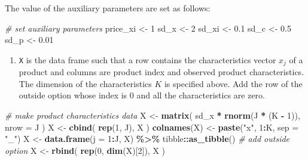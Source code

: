 \documentclass[
]{book}
\newenvironment{Shaded}{\begin{snugshade}}{\end{snugshade}}
\newcommand{\AttributeTok}[1]{\textcolor[rgb]{0.13,0.29,0.53}{#1}}
\newcommand{\CommentTok}[1]{\textcolor[rgb]{0.56,0.35,0.01}{\textit{#1}}}
\newcommand{\DecValTok}[1]{\textcolor[rgb]{0.00,0.00,0.81}{#1}}
\newcommand{\FloatTok}[1]{\textcolor[rgb]{0.00,0.00,0.81}{#1}}
\newcommand{\FunctionTok}[1]{\textcolor[rgb]{0.13,0.29,0.53}{\textbf{#1}}}
\newcommand{\NormalTok}[1]{#1}
\newcommand{\OtherTok}[1]{\textcolor[rgb]{0.56,0.35,0.01}{#1}}
\newcommand{\SpecialCharTok}[1]{\textcolor[rgb]{0.81,0.36,0.00}{\textbf{#1}}}
\newcommand{\StringTok}[1]{\textcolor[rgb]{0.31,0.60,0.02}{#1}}
\providecommand{\tightlist}{%
  \setlength{\itemsep}{0pt}\setlength{\parskip}{0pt}}
\begin{document}
The value of the auxiliary parameters are set as follows:

\begin{Shaded}
\begin{Highlighting}[]
\CommentTok{\# set auxiliary parameters}
\NormalTok{price\_xi }\OtherTok{\textless{}{-}} \DecValTok{1}
\NormalTok{sd\_x }\OtherTok{\textless{}{-}} \DecValTok{2}
\NormalTok{sd\_xi }\OtherTok{\textless{}{-}} \FloatTok{0.1}
\NormalTok{sd\_c }\OtherTok{\textless{}{-}} \FloatTok{0.5}
\NormalTok{sd\_p }\OtherTok{\textless{}{-}} \FloatTok{0.01}
\end{Highlighting}
\end{Shaded}

\begin{enumerate}
\def\labelenumi{\arabic{enumi}.}
\setcounter{enumi}{1}
\tightlist
\item
  \texttt{X} is the data frame such that a row contains the characteristics vector \(x_{j}\) of a product and columns are product index and observed product characteristics. The dimension of the characteristics \(K\) is specified above. Add the row of the outside option whose index is \(0\) and all the characteristics are zero.
\end{enumerate}

\begin{Shaded}
\begin{Highlighting}[]
\CommentTok{\# make product characteristics data}
\NormalTok{X }\OtherTok{\textless{}{-}} 
  \FunctionTok{matrix}\NormalTok{(}
\NormalTok{    sd\_x }\SpecialCharTok{*} \FunctionTok{rnorm}\NormalTok{(J }\SpecialCharTok{*}\NormalTok{ (K }\SpecialCharTok{{-}} \DecValTok{1}\NormalTok{)), }
    \AttributeTok{nrow =}\NormalTok{ J}
\NormalTok{    )}
\NormalTok{X }\OtherTok{\textless{}{-}} 
  \FunctionTok{cbind}\NormalTok{(}
    \FunctionTok{rep}\NormalTok{(}\DecValTok{1}\NormalTok{, J), }
\NormalTok{    X}
\NormalTok{    )}
\FunctionTok{colnames}\NormalTok{(X) }\OtherTok{\textless{}{-}} \FunctionTok{paste}\NormalTok{(}\StringTok{"x"}\NormalTok{, }\DecValTok{1}\SpecialCharTok{:}\NormalTok{K, }\AttributeTok{sep =} \StringTok{"\_"}\NormalTok{)}
\NormalTok{X }\OtherTok{\textless{}{-}} 
  \FunctionTok{data.frame}\NormalTok{(}\AttributeTok{j =} \DecValTok{1}\SpecialCharTok{:}\NormalTok{J, X) }\SpecialCharTok{\%\textgreater{}\%}
\NormalTok{  tibble}\SpecialCharTok{::}\FunctionTok{as\_tibble}\NormalTok{()}
\CommentTok{\# add outside option}
\NormalTok{X }\OtherTok{\textless{}{-}} 
  \FunctionTok{rbind}\NormalTok{(}
    \FunctionTok{rep}\NormalTok{(}\DecValTok{0}\NormalTok{, }\FunctionTok{dim}\NormalTok{(X)[}\DecValTok{2}\NormalTok{]),}
\NormalTok{    X}
\NormalTok{    ) }
\end{Highlighting}
\end{Shaded}
\end{document}
